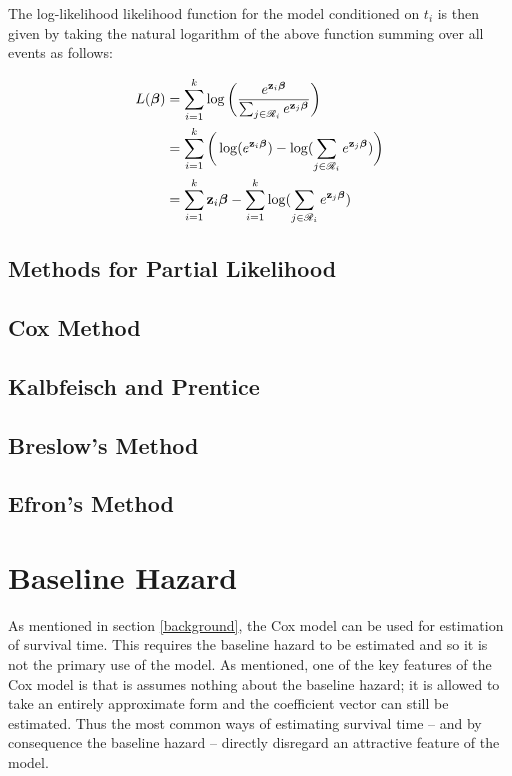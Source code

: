 The log-likelihood likelihood function for the model conditioned on ${t_i}$ is then given by taking the natural logarithm of the above function summing over all events as follows:

\begin{align}
    L(\boldsymbol{\beta}) &= \sum_{i=1}^k \log\bigg(\frac{e^{\textbf{z}_i\boldsymbol{\beta}}}{\sum_{j\in\mathscr{R}_i}e^{\textbf{z}_j\boldsymbol{\beta}}}\bigg)\\
    &= \sum_{i=1}^k \bigg( \log(e^{\textbf{z}_i\boldsymbol{\beta}}) - \log(\sum_{j\in\mathscr{R}_i}e^{\textbf{z}_j\boldsymbol{\beta}})\bigg)\\
    &= \sum_{i=1}^k \textbf{z}_i\boldsymbol{\beta} - \sum_{i=1}^k \log(\sum_{j\in\mathscr{R}_i}e^{\textbf{z}_j\boldsymbol{\beta}})
\end{align}



\subsection{Methods for Partial Likelihood}
\subsection{Cox Method}
\subsection{Kalbfeisch and Prentice}
\subsection{Breslow's Method}
\subsection{Efron's Method}

\newpage
\section{Baseline Hazard}\label{baseline}

As mentioned in section \ref{background}, the Cox model can be used for estimation of survival time. This requires the baseline hazard to be estimated and so it is not the primary use of the model. As mentioned, one of the key features of the Cox model is that is assumes nothing about the baseline hazard; it is allowed to take an entirely approximate form and the coefficient vector can still be estimated. Thus the most common ways of estimating survival time -- and by consequence the baseline hazard -- directly disregard an attractive feature of the model.

